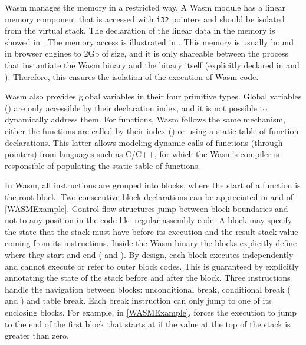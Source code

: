 Wasm  manages the memory in a restricted way. A Wasm  module has a linear memory component that is accessed with \texttt{i32} pointers and should be isolated from the virtual stack. The declaration of the linear data in the memory is showed in . The memory access is illustrated in . This memory is usually bound in browser engines to 2Gb of size, and it is only shareable between the process that instantiate the Wasm  binary and the binary itself (explicitly declared in  and ). Therefore, this ensures the isolation of the execution of Wasm  code. 

Wasm  also provides global variables in their four primitive types. Global variables () are only accessible by their declaration index, and it is not possible to dynamically address them. For functions, Wasm  follows the same mechanism, either the functions are called by their index () or using a static table of function declarations. This latter allows modeling dynamic calls of functions (through pointers) from languages such as C/C++, for which the Wasm's compiler is responsible of populating the static table of functions.


In Wasm, all instructions are grouped into blocks, where the start of a function is the root block. Two consecutive block declarations can be appreciated in  and  of \autoref{WASMExample}. Control flow structures jump between block boundaries and not to any position in the code like regular assembly code. A block may specify the state that the stack must have before its execution and the result stack value coming from its instructions. Inside the Wasm  binary the blocks explicitly define where they start and end ( and ). By design, each block executes independently and cannot execute or refer to outer block codes. This is guaranteed by explicitly annotating the state of the stack before and after the block. Three instructions handle the navigation between blocks: unconditional break, conditional break ( and ) and table break. Each break instruction can only jump to one of its enclosing blocks. For example, in \autoref{WASMExample},  forces the execution to jump to the end of the first block that starts at  if the value at the top of the stack is greater than zero.


